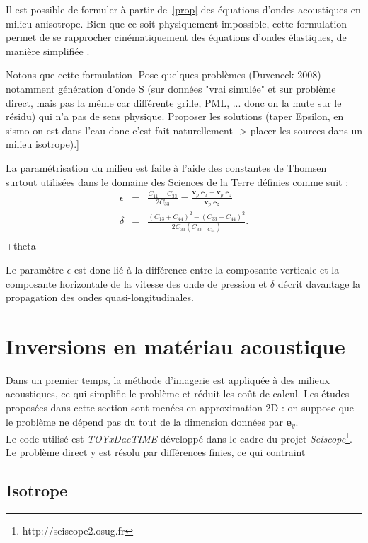 Il est possible de formuler à partir de~\ref{prop} des équations d'ondes acoustiques en milieu anisotrope. Bien que ce soit physiquement impossible, cette formulation permet de se rapprocher cinématiquement des équations d'ondes élastiques, de manière simplifiée \citep{alkhalifah}.

Notons que cette formulation [Pose quelques problèmes (Duveneck 2008) notamment génération d'onde S (sur données "vrai simulée"  et sur problème direct, mais pas la même car différente grille, PML, ... donc on la mute sur le résidu) qui n'a pas de sens physique. Proposer les solutions (taper Epsilon, en sismo on est dans l'eau donc c'est fait naturellement -> placer les sources dans un milieu isotrope).]
 

La paramétrisation du milieu est faite à l'aide des constantes de Thomsen~\citep{thomsen} surtout utilisées dans le domaine des Sciences de la Terre définies comme suit : 
\begin{eqnarray}
	\epsilon & =  & \frac{C_{11}-C_{33}}{2C_{33}} = \frac{\bm{v}_{p}.\bm{e}_{x} -  \bm{v}_{p}.\bm{e}_{z}}{\bm{v}_{p}.\bm{e}_{z}}\\
	\delta & = & \frac{(C_{13}+C_{44})^2-(C_{33}-C_{44})^2}{2C_{33}(C_{33-C_{44}})}\text{.}\\
\end{eqnarray}
+theta

Le paramètre $\epsilon$ est donc lié à la différence entre la composante verticale et la composante horizontale de la vitesse des onde de pression et $\delta$ décrit davantage la propagation des ondes quasi-longitudinales.



\section{Inversions en matériau acoustique }

Dans un premier temps, la méthode d'imagerie est appliquée à des milieux acoustiques, ce qui simplifie le problème et réduit les coût de calcul. Les études proposées dans cette section sont menées en approximation 2D : on suppose que le problème ne dépend pas du tout de la dimension données par $\bm{e}_{y}$.\\

Le code utilisé est \emph{TOYxDacTIME} développé dans le cadre du projet \emph{Seiscope}\footnote{http://seiscope2.osug.fr}. Le problème direct y est résolu par différences finies, ce qui contraint 

\subsection{Isotrope}




